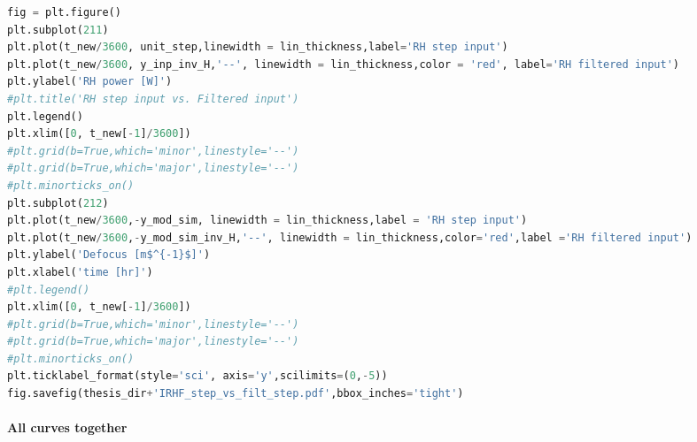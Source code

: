 \begin{spacing}{1} \begin{lstlisting}[language=Python]
fig = plt.figure()
plt.subplot(211)
plt.plot(t_new/3600, unit_step,linewidth = lin_thickness,label='RH step input')
plt.plot(t_new/3600, y_inp_inv_H,'--', linewidth = lin_thickness,color = 'red', label='RH filtered input')
plt.ylabel('RH power [W]')
#plt.title('RH step input vs. Filtered input')
plt.legend()
plt.xlim([0, t_new[-1]/3600])
#plt.grid(b=True,which='minor',linestyle='--')
#plt.grid(b=True,which='major',linestyle='--')
#plt.minorticks_on()
plt.subplot(212)
plt.plot(t_new/3600,-y_mod_sim, linewidth = lin_thickness,label = 'RH step input')
plt.plot(t_new/3600,-y_mod_sim_inv_H,'--', linewidth = lin_thickness,color='red',label ='RH filtered input')
plt.ylabel('Defocus [m$^{-1}$]')
plt.xlabel('time [hr]')
#plt.legend()
plt.xlim([0, t_new[-1]/3600])
#plt.grid(b=True,which='minor',linestyle='--')
#plt.grid(b=True,which='major',linestyle='--')
#plt.minorticks_on()
plt.ticklabel_format(style='sci', axis='y',scilimits=(0,-5))
fig.savefig(thesis_dir+'IRHF_step_vs_filt_step.pdf',bbox_inches='tight')
\end{lstlisting} \end{spacing}


\hypertarget{all-curves-together}{%
\paragraph{All curves together}\label{all-curves-together}}

